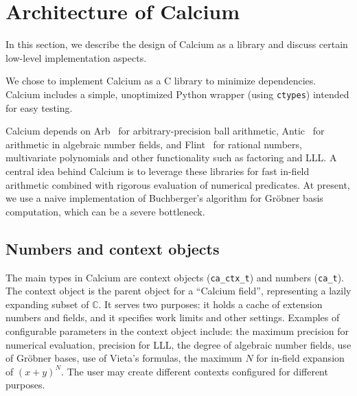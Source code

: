 \documentclass[11pt,a4paper]{article}
\begin{document}
\section{Architecture of Calcium}

\label{sect:calcium}

In this section, we describe the design of Calcium
as a library and discuss certain low-level implementation
aspects.

We chose to implement Calcium as a C library
to minimize dependencies.
Calcium includes a simple, unoptimized Python wrapper (using \texttt{ctypes})
intended for easy testing.

Calcium depends on
Arb~\cite{Joh2017} for arbitrary-precision ball arithmetic,
Antic~\cite{Har2015} for arithmetic in algebraic number fields,
and Flint~\cite{Har2010} for rational numbers,
multivariate polynomials and other functionality such as factoring and LLL.
A central idea behind Calcium is to leverage
these libraries for fast in-field arithmetic combined with rigorous evaluation of numerical predicates.
At present, we use a naive implementation of Buchberger's algorithm for
Gr\"{o}bner basis computation, which can be a severe bottleneck.

\subsection{Numbers and context objects}

The main types in Calcium are context objects (\texttt{ca\_ctx\_t})
and numbers (\texttt{ca\_t}). The context object
is the parent object for a 
``Calcium field'', representing a lazily expanding subset of $\mathbb{C}$.
It serves two purposes: it holds a cache of extension numbers
and fields, and it specifies work limits and other settings.
Examples of configurable parameters in the context object include:
the maximum precision for numerical evaluation,
precision for LLL,
the degree of algebraic number fields,
use of Gr\"{o}bner bases, use of Vieta's formulas,
the maximum $N$ for in-field expansion of $(x+y)^N$.
The user may create different contexts configured for different purposes.
\end{document}
